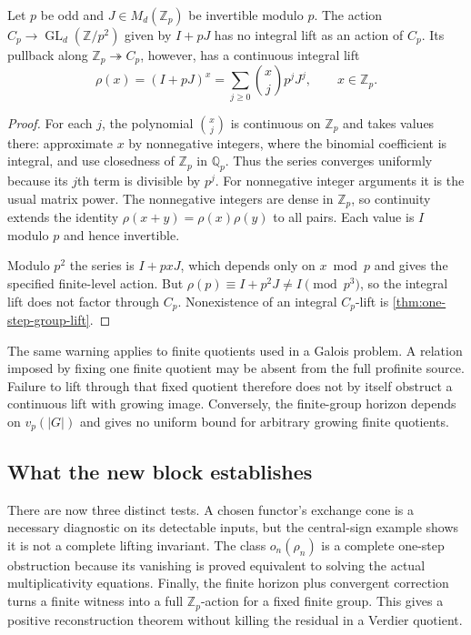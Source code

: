 \begin{proposition}\label{prop:profinite-quotient-boundary}
Let $p$ be odd and $J\in M_d(\mathbb Z_p)$ be invertible modulo $p$. The action $C_p\to\operatorname{GL}_d(\mathbb Z/p^2)$ given by $I+pJ$ has no integral lift as an action of $C_p$. Its pullback along $\mathbb Z_p\twoheadrightarrow C_p$, however, has a continuous integral lift
\[
 \rho(x)=(I+pJ)^x
 =\sum_{j\geq0}\binom{x}{j}p^jJ^j,
 \qquad x\in\mathbb Z_p.
\]
\end{proposition}
\begin{proof}
For each $j$, the polynomial $\binom{x}{j}$ is continuous on $\mathbb Z_p$ and takes values there: approximate $x$ by nonnegative integers, where the binomial coefficient is integral, and use closedness of $\mathbb Z_p$ in $\mathbb Q_p$. Thus the series converges uniformly because its $j$th term is divisible by $p^j$. For nonnegative integer arguments it is the usual matrix power. The nonnegative integers are dense in $\mathbb Z_p$, so continuity extends the identity $\rho(x+y)=\rho(x)\rho(y)$ to all pairs. Each value is $I$ modulo $p$ and hence invertible.

Modulo $p^2$ the series is $I+pxJ$, which depends only on $x\bmod p$ and gives the specified finite-level action. But $\rho(p)\equiv I+p^2J\ne I\pmod{p^3}$, so the integral lift does not factor through $C_p$. Nonexistence of an integral $C_p$-lift is \cref{thm:one-step-group-lift}.
\end{proof}

The same warning applies to finite quotients used in a Galois problem. A relation imposed by fixing one finite quotient may be absent from the full profinite source. Failure to lift through that fixed quotient therefore does not by itself obstruct a continuous lift with growing image. Conversely, the finite-group horizon depends on $v_p(|G|)$ and gives no uniform bound for arbitrary growing finite quotients.

\subsection{What the new block establishes}

There are now three distinct tests. A chosen functor's exchange cone is a necessary diagnostic on its detectable inputs, but the central-sign example shows it is not a complete lifting invariant. The class $o_n(\rho_n)$ is a complete one-step obstruction because its vanishing is proved equivalent to solving the actual multiplicativity equations. Finally, the finite horizon plus convergent correction turns a finite witness into a full $\mathbb Z_p$-action for a fixed finite group. This gives a positive reconstruction theorem without killing the residual in a Verdier quotient.

